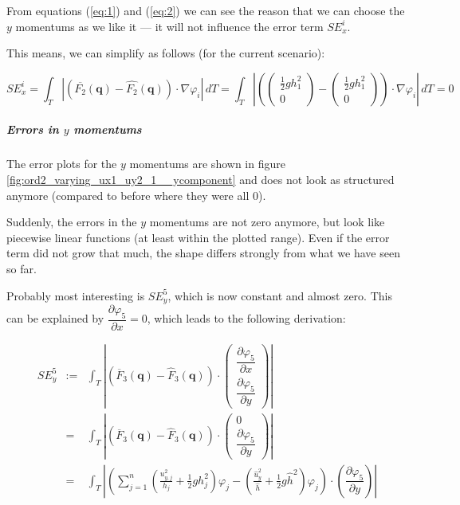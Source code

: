 \documentclass{article}
\newcommand{\pd}[2]{\dfrac{\partial #1}{\partial #2}}
\renewcommand{\phi}{\varphi}
\begin{document}
From equations (\ref{eq:1}) and (\ref{eq:2}) we can see the reason that we can choose the $y$ momentums as we like it --- it will not influence the error term $SE_x^i$.

This means, we can simplify as follows (for the current scenario):

\begin{equation*}
  SE_x^i = \int_T \left| \left(\overline{F_2}(\mathbf{q}) - \widehat{F_2}(\mathbf{q})\right) \cdot \nabla \phi_i \right|\, dT = \int_T \left|
    \left(
      \begin{pmatrix}
        \frac{1}{2} g h_1^2 \\ 0
      \end{pmatrix} -
      \begin{pmatrix}
        \frac{1}{2} g h_1^2 \\ 0
      \end{pmatrix}
    \right)
    \cdot \nabla \phi_i \right|\, dT =
  0
\end{equation*}

\subparagraph{\texorpdfstring{Errors in $y$ momentums}{Errors in y momentums}}

The error plots for the $y$ momentums are shown in figure \ref{fig:ord2_varying_ux1_uy2_1__ycomponent} and does not look as structured anymore (compared to before where they were all 0).



Suddenly, the errors in the $y$ momentums are not zero anymore, but look like piecewise linear functions (at least within the plotted range). Even if the error term did not grow that much, the shape differs strongly from what we have seen so far.

Probably most interesting is $SE_y^5$, which is now constant and almost zero. This can be explained by $\pd{\phi_5}{x}=0$, which leads to the following derivation:

\begin{eqnarray*}
  SE_y^5 & := & \int_T \left| \left(\overline{F}_3\left(\mathbf{q}\right) - \widehat{F}_3\left(\mathbf{q}\right)\right) \cdot \begin{pmatrix}\pd{\phi_5}{x} \\ \pd{\phi_5}{y}\end{pmatrix}\right| \\
  {} & = & \int_T \left| \left(\overline{F}_3\left(\mathbf{q}\right) - \widehat{F}_3\left(\mathbf{q}\right)\right) \cdot \begin{pmatrix}0 \\ \pd{\phi_5}{y}\end{pmatrix}\right| \\
  {} & = & \int_T \left| \left( \sum_{j=1}^n \left(\frac{u_{y,j}^2}{h_j} + \frac{1}{2} g h_j^2\right) \phi_j - \left( \frac{\widehat{u}_y^2}{\widehat{h}} + \frac{1}{2} g \widehat{h}^2 \right) \phi_j \right) \cdot \left(\pd{\phi_5}{y}\right) \right| \\
\end{eqnarray*}
\end{document}
